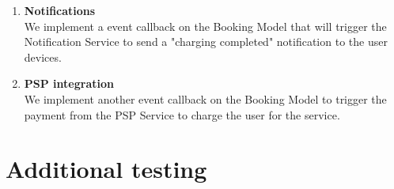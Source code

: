 \begin{enumerate}
	\item \textbf{Notifications}\\ We implement a event callback on the Booking Model that will trigger the Notification Service to send a "charging completed" notification to the user devices.
	\item \textbf{PSP integration}\\ We implement another event callback on the Booking Model to trigger the payment from the PSP Service to charge the user for the service.
\end{enumerate}

\section{Additional testing}








